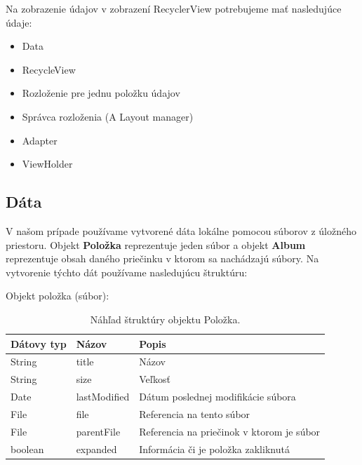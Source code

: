 \documentclass[12pt, oneside]{book}
\begin{document}
Na zobrazenie údajov v zobrazení RecyclerView potrebujeme mať nasledujúce údaje:
\begin{itemize}
    \item Data
    \item RecycleView
    \item Rozloženie pre jednu položku údajov
    \item Správca rozloženia (A Layout manager)
    \item Adapter
    \item ViewHolder
\end{itemize}

\subsection{Dáta}
\label{sec:data}

\hspace{15pt} V našom prípade používame vytvorené dáta lokálne pomocou súborov z úložného priestoru. Objekt \textbf{Položka} reprezentuje jeden súbor a objekt \textbf{Album} reprezentuje obsah daného priečinku v ktorom sa nachádzajú súbory. Na vytvorenie týchto dát používame nasledujúcu štruktúru: 
\begin{table}[H]

Objekt položka (súbor):
\begin{center}
\begin{tabularx}{1\textwidth} { 
  | >{\raggedright\arraybackslash}X 
  | >{\raggedright\arraybackslash}X 
  | >{\raggedright\arraybackslash}X | }
  \hline
 \textbf{Dátovy typ}  & \textbf{Názov} & \textbf{Popis} \\
 \hline
String & title & Názov \\
 \hline
String  & size & Veľkosť  \\
 \hline
Date  & lastModified & Dátum poslednej modifikácie súbora  \\
 \hline
File  & file & Referencia na tento súbor  \\
  \hline
File  & parentFile & Referencia na priečinok v ktorom je súbor  \\
\hline
boolean  & expanded & Informácia či je položka zakliknutá  \\
\hline

\end{tabularx}
\caption{Náhľad štruktúry objektu Položka. }
\end{center}
\end{table}
\end{document}
